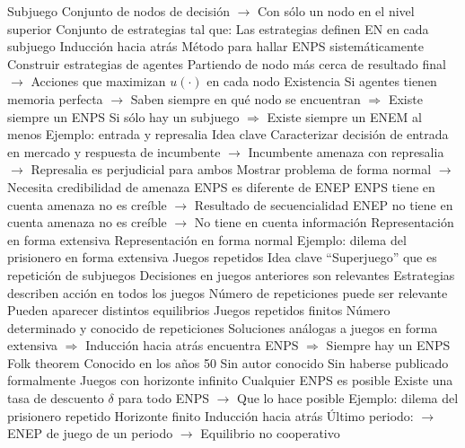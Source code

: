 \documentclass{nuevotema}
\begin{document}
\begin{esquemal}
				\4 Subjuego
				\4[] Conjunto de nodos de decisión
				\4[] $\to$ Con sólo un nodo en el nivel superior
				\4 Conjunto de estrategias tal que:
				\4[] Las estrategias definen EN en cada subjuego
				\4 Inducción hacia atrás
				\4[] Método para hallar ENPS sistemáticamente
				\4[] Construir estrategias de agentes
				\4[] Partiendo de nodo más cerca de resultado final
				\4[] $\to$ Acciones que maximizan $u(\cdot)$ en cada nodo
				\4 Existencia
				\4[] Si agentes tienen memoria perfecta
				\4[] $\to$ Saben siempre en qué nodo se encuentran
				\4[] $\Rightarrow$ Existe siempre un ENPS
				\4[] Si sólo hay un subjuego
				\4[] $\Rightarrow$ Existe siempre un ENEM al menos
				\4[] 
			\3 Ejemplo: entrada y represalia
				\4 Idea clave
				\4[] Caracterizar decisión de entrada en mercado
				\4[] y respuesta de incumbente
				\4[] $\to$ Incumbente amenaza con represalia
				\4[] $\to$ Represalia es perjudicial para ambos
				\4[] Mostrar problema de forma normal
				\4[] $\to$ Necesita credibilidad de amenaza
				\4 ENPS es diferente de ENEP
				\4[] ENPS tiene en cuenta amenaza no es creíble
				\4[] $\to$ Resultado de secuencialidad
				\4[] ENEP no tiene en cuenta amenaza no es creíble
				\4[] $\to$ No tiene en cuenta información
				\4 Representación en forma extensiva
				\4[] 
				\4 Representación en forma normal
				\4[] 
			\3 Ejemplo: dilema del prisionero en forma extensiva
				\4[] 
		\2 Juegos repetidos
			\3 Idea clave
				\4 ``Superjuego'' que es repetición de subjuegos
				\4 Decisiones en juegos anteriores son relevantes
				\4 Estrategias describen acción en todos los juegos
				\4 Número de repeticiones puede ser relevante
				\4[$\Rightarrow$] Pueden aparecer distintos equilibrios
			\3 Juegos repetidos finitos
				\4 Número determinado y conocido de repeticiones
				\4 Soluciones análogas a juegos en forma extensiva
				\4[] $\Rightarrow$ Inducción hacia atrás encuentra ENPS
				\4[] $\Rightarrow$ Siempre hay un ENPS
			\3 Folk theorem
				\4 Conocido en los años 50
				\4[] Sin autor conocido
				\4[] Sin haberse publicado formalmente
				\4 Juegos con horizonte infinito
				\4 Cualquier ENPS es posible
				\4[] Existe una tasa de descuento $\delta$ para todo ENPS
				\4[] $\to$ Que lo hace posible
			\3 Ejemplo: dilema del prisionero repetido
				\4 Horizonte finito
				\4[] Inducción hacia atrás
				\4[] Último periodo:
				\4[] $\to$ ENEP de juego de un periodo
				\4[] $\to$ Equilibrio no cooperativo

\end{esquemal}
\end{document}
